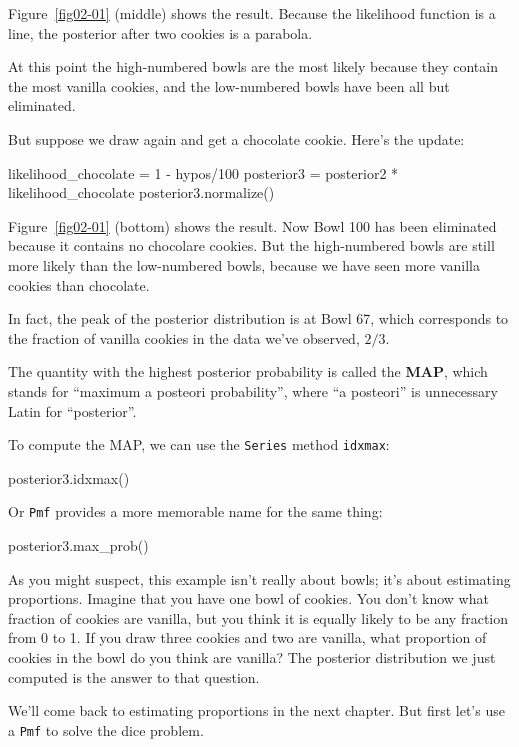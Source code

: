 \documentclass[12pt]{book}
\theoremstyle{exercise}
\newcommand{\py}[1]{{\tt #1}}%
\begin{document}
Figure~\ref{fig02-01} (middle) shows the result.
Because the likelihood function is a line, the posterior after two cookies is a parabola.

At this point the high-numbered bowls are the most likely because they contain the most vanilla cookies, and the low-numbered bowls have been all but eliminated.

But suppose we draw again and get a chocolate cookie.
Here's the update:

\begin{code}
likelihood_chocolate = 1 - hypos/100
posterior3 = posterior2 * likelihood_chocolate
posterior3.normalize()
\end{code}

Figure~\ref{fig02-01} (bottom) shows the result.
Now Bowl 100 has been eliminated because it contains no chocolare cookies.
But the high-numbered bowls are still more likely than the low-numbered bowls, because we have seen more vanilla cookies than chocolate.

In fact, the peak of the posterior distribution is at Bowl 67, which corresponds to the fraction of vanilla cookies in the data we've observed, $2/3$.

The quantity with the highest posterior probability is called the {\bf MAP}, which stands for ``maximum a posteori probability'', where ``a posteori'' is unnecessary Latin for ``posterior''.

To compute the MAP, we can use the \py{Series} method \py{idxmax}:

\begin{code}
posterior3.idxmax()
\end{code}

Or \py{Pmf} provides a more memorable name for the same thing:

\begin{code}
 posterior3.max_prob()
\end{code}

As you might suspect, this example isn't really about bowls; it's about estimating proportions.
Imagine that you have one bowl of cookies.
You don't know what fraction of cookies are vanilla, but you think it is equally likely to be any fraction from 0 to 1.
If you draw three cookies and two are vanilla, what proportion of cookies in the bowl do you think are vanilla?
The posterior distribution we just computed is the answer to that question.

We'll come back to estimating proportions in the next chapter.
But first let's use a \py{Pmf} to solve the dice problem.
\end{document}
